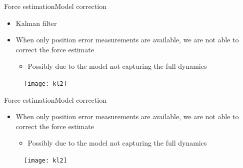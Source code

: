 \begin{frame}{Force estimation}{Model correction}
\begin{itemize}
\item Kalman filter 
\item When only position error measurements are available, we are not able to correct the force estimate
\begin{itemize}
\item Possibly due to the model not capturing the full dynamics
\end{itemize}
\end{itemize}
\begin{figure}
\centering
\texttt{[image: kl2]}
\end{figure}
\end{frame}

\begin{frame}{Force estimation}{Model correction}
\begin{itemize}
\item When only position error measurements are available, we are not able to correct the force estimate
\begin{itemize}
\item Possibly due to the model not capturing the full dynamics
\end{itemize}
\end{itemize}
\begin{figure}
\centering
\texttt{[image: kl2]}
\end{figure}
\end{frame}



